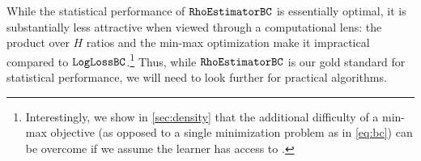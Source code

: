 While the statistical performance of $\texttt{RhoEstimatorBC}$ is essentially optimal, it is substantially less attractive when viewed through a computational lens: 
the product over $H$ ratios and the min-max optimization make it impractical compared to $\texttt{LogLossBC}$.\footnote{Interestingly, we show in \cref{sec:density} that the additional difficulty of a min-max objective (as opposed to a single minimization problem as in \cref{eq:bc}) can be overcome if we assume the learner has access to \emph{\densobs}. %
}
Thus, while $\texttt{RhoEstimatorBC}$ is our gold standard for statistical performance, we will need to look further for practical algorithms.\loose





